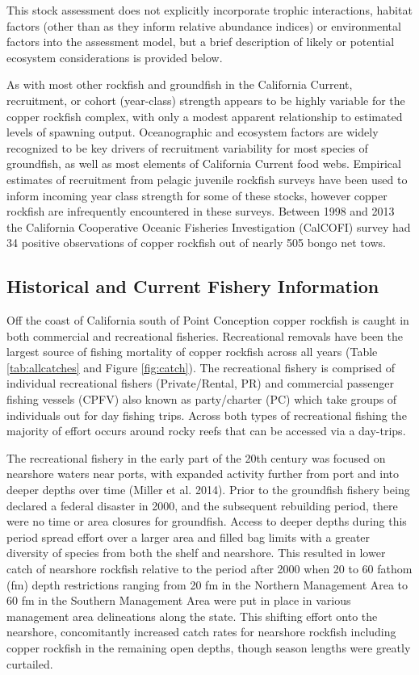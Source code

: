 \documentclass[11pt,
  english,
  letterpaper,
]{article}
\begin{document}
This stock assessment does not explicitly incorporate trophic interactions, habitat factors (other than as they inform relative abundance indices) or environmental factors into the assessment model, but a brief description of likely or potential ecosystem considerations is provided below.

As with most other rockfish and groundfish in the California Current, recruitment, or cohort (year-class) strength appears to be highly variable for the copper rockfish complex, with only a modest apparent relationship to estimated levels of spawning output. Oceanographic and ecosystem factors are widely recognized to be key drivers of recruitment variability for most species of groundfish, as well as most elements of California Current food webs. Empirical estimates of recruitment from pelagic juvenile rockfish surveys have been used to inform incoming year class strength for some of these stocks, however copper rockfish are infrequently encountered in these surveys. Between 1998 and 2013 the California Cooperative Oceanic Fisheries Investigation (CalCOFI) survey had 34 positive observations of copper rockfish out of nearly 505 bongo net tows.

\hypertarget{historical-and-current-fishery-information}{%
\subsection{Historical and Current Fishery Information}\label{historical-and-current-fishery-information}}

Off the coast of California south of Point Conception copper rockfish is caught in both commercial and recreational fisheries. Recreational removals have been the largest source of fishing mortality of copper rockfish across all years (Table \ref{tab:allcatches} and Figure \ref{fig:catch}). The recreational fishery is comprised of individual recreational fishers (Private/Rental, PR) and commercial passenger fishing vessels (CPFV) also known as party/charter (PC) which take groups of individuals out for day fishing trips. Across both types of recreational fishing the majority of effort occurs around rocky reefs that can be accessed via a day-trips.

The recreational fishery in the early part of the 20th century was focused on nearshore waters near ports, with expanded activity further from port and into deeper depths over time (Miller et al. 2014). Prior to the groundfish fishery being declared a federal disaster in 2000, and the subsequent rebuilding period, there were no time or area closures for groundfish. Access to deeper depths during this period spread effort over a larger area and filled bag limits with a greater diversity of species from both the shelf and nearshore. This resulted in lower catch of nearshore rockfish relative to the period after 2000 when 20 to 60 fathom (fm) depth restrictions ranging from 20 fm in the Northern Management Area to 60 fm in the Southern Management Area were put in place in various management area delineations along the state. This shifting effort onto the nearshore, concomitantly increased catch rates for nearshore rockfish including copper rockfish in the remaining open depths, though season lengths were greatly curtailed.
\end{document}
